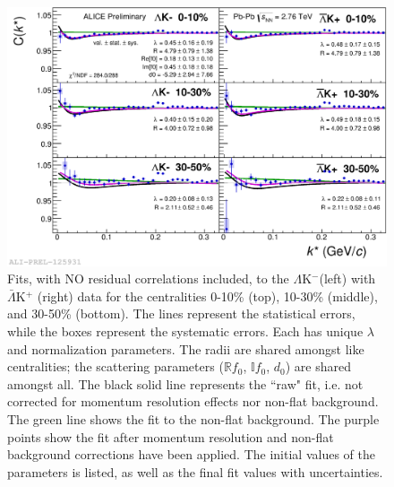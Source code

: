 \documentclass[../AnalysisNoteJBuxton.tex]{subfiles}
\begin{document}
\begin{figure}[h]
  \centering
  \includegraphics[width=\textwidth]{7_ResultsAndDiscussion/Figures/2017-Feb-03-canKStarCfwFitsLamKchMwConj_0010_1030_3050_MomResCrctn_NonFlatBgdCrctn.png}
  \caption[$\Lambda$K$^{-}$($\bar{\Lambda}$K$^{+}$) Fits with No Residuals]{Fits, with NO residual correlations included, to the $\Lambda$K$^{-}$(left) with $\bar{\Lambda}$K$^{+}$ (right) data for the centralities 0-10\% (top), 10-30\% (middle), and 30-50\% (bottom).
The lines represent the statistical errors, while the boxes represent the systematic errors.  
Each has unique $\lambda$ and normalization parameters.
The radii are shared amongst like centralities; the scattering parameters ($\mathbb{R}f_{0}$, $\mathbb{I}f_{0}$, $d_{0}$) are shared amongst all.
The black solid line represents the ``raw" fit, i.e. not corrected for momentum resolution effects nor non-flat background.  
The green line shows the fit to the non-flat background.
The purple points show the fit after momentum resolution and non-flat background corrections have been applied.
The initial values of the parameters is listed, as well as the final fit values with uncertainties.}
  \label{fig:LamKchMwConjFits_NoRes}
\end{figure}
\end{document}
